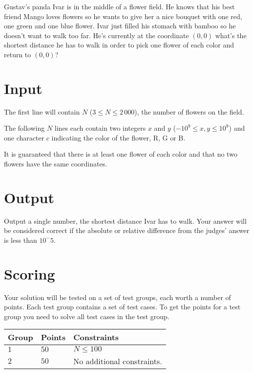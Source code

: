 \noindent

Gustav's panda Ivar is in the middle of a flower field.
He knows that his best friend Mango loves flowers so he wants to give her a nice bouquet with one red, one green and one blue flower.
Ivar just filled his stomach with bamboo so he doesn't want to walk too far.
He's currently at the coordinate $(0,0)$ what's the shortest distance he has to walk in order to pick one flower of each color and return to $(0,0)$?

\section*{Input}
The first line will contain $N$ ($3 \leq N \leq 2\,000$), the number of flowers on the field.

The following $N$ lines each contain two integers $x$ and $y$ ($-10^9 \leq x,y \leq 10^9$) and one character $c$ indicating the color of the flower, R, G or B.

It is guaranteed that there is at least one flower of each color and that no two flowers have the same coordinates.

\section*{Output}
Output a single number, the shortest distance Ivar has to walk.
Your answer will be considered correct if the absolute or relative difference from the judges' answer is less than $10^-5$.

\section*{Scoring}
Your solution will be tested on a set of test groups, each worth a number of points. Each test group contains
a set of test cases. To get the points for a test group you need to solve all test cases in the test group.

\noindent
\begin{tabular}{| l | l | p{12cm} |}
  \hline
  \textbf{Group} & \textbf{Points} & \textbf{Constraints} \\ \hline
  $1$    & $50$       & $N \leq 100$ \\ \hline
  $2$    & $50$       & No additional constraints. \\ \hline
\end{tabular}
